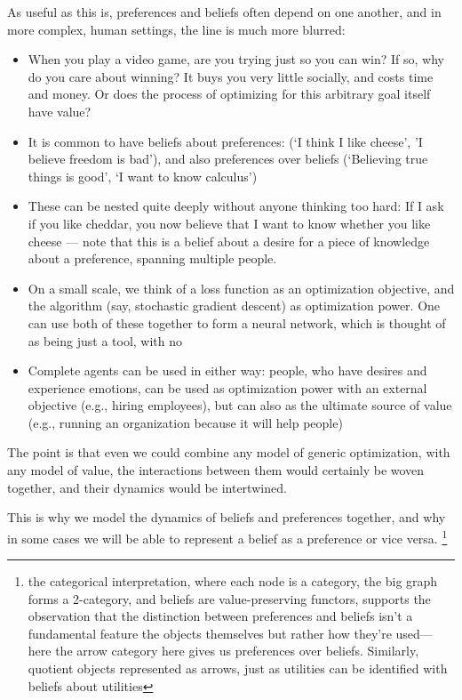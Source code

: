 \documentclass{article}
\begin{document}
	As useful as this is, preferences and beliefs often depend on one another, and in more complex, human settings, the line is much more blurred:
	\begin{itemize}[nosep]
		\item When you play a video game, are you trying just so you can win? If so, why do you care about winning? It buys you very little socially, and costs time and money. Or does the process of optimizing for this arbitrary goal itself have value?
		\item It is common to have beliefs about preferences: (`I think I like cheese', 'I believe freedom is bad'), and also preferences over beliefs (`Believing true things is good', `I want to know calculus')
		\item These can be nested quite deeply without anyone thinking too hard: If I ask if you like cheddar, you now believe that I want to know whether you like cheese --- note that this is a belief about a desire for a piece of knowledge about a preference, spanning multiple people.

		\item On a small scale, we think of a loss function as an optimization objective, and the algorithm (say, stochastic gradient descent) as optimization power. One can use both of these together to form a neural network, which is thought of as being just a tool, with no

		\item Complete agents can be used in either way: people, who have desires and experience emotions, can be used as optimization power with an external objective (e.g., hiring employees), but can also as the ultimate source of value (e.g., running an organization because it will help people)
	\end{itemize}
	The point is that even we could combine any model of generic optimization, with any model of value, the interactions between them would certainly be woven together, and their dynamics would be intertwined.
	
	{\color{green!30!black}This is why we model the dynamics of beliefs and preferences together, and why in some cases we will be able to represent a belief as a preference or vice versa. \footnote{the categorical interpretation, where each node is a category, the big graph forms a 2-category, and beliefs are value-preserving functors, supports the observation that the distinction between preferences and beliefs isn't a fundamental feature the objects themselves but rather how they're used--- here the arrow category here gives us preferences over beliefs. Similarly, quotient objects represented as arrows, just as utilities can be identified with beliefs about utilities}}
	
\end{document}
